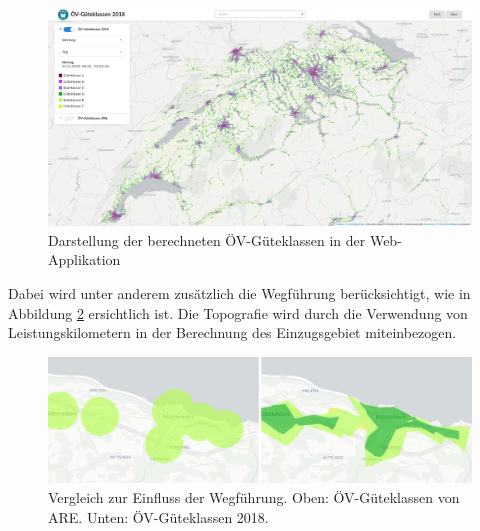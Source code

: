 \begin{figure}[ht]
    \centering
    \includegraphics[width=1\linewidth]{technicalreport/img/resultat_oevgk18_uebersicht}
    \caption[Darstellung der berechneten ÖV-Güteklassen in der Web-Applikation]{Darstellung der berechneten ÖV-Güteklassen in der Web-Applikation}
    \label{fig:mntg_sum_resultat_webapp_uebersicht}
\end{figure}

Dabei wird unter anderem zusätzlich die Wegführung berücksichtigt, wie in Abbildung \ref{fig:mgmt_summary_vergleich_wegfuehrung} ersichtlich ist.
Die Topografie wird durch die Verwendung von Leistungskilometern in der Berechnung des Einzugsgebiet miteinbezogen.

\begin{figure}[ht]
    \centering
    \includegraphics[width=0.8\linewidth]{start/img/vergleich_wegfuehrung}
    \caption[Vergleich zur Einfluss der Wegführung]{Vergleich zur Einfluss der Wegführung. Oben: ÖV-Güteklassen von \ac{ARE}. Unten: ÖV-Güteklassen 2018.}
    \label{fig:mgmt_summary_vergleich_wegfuehrung}
\end{figure}

